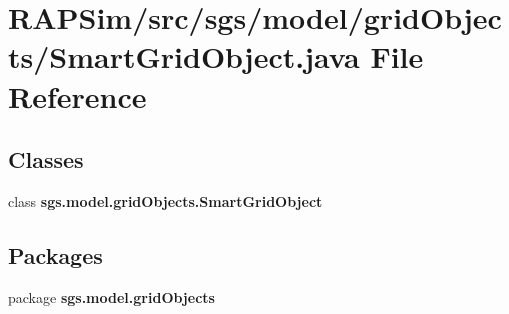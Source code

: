 \section{R\-A\-P\-Sim/src/sgs/model/grid\-Objects/\-Smart\-Grid\-Object.java File Reference}
\label{_smart_grid_object_8java}
\subsection*{Classes}
\begin{DoxyCompactItemize}
\item 
class {\bf sgs.\-model.\-grid\-Objects.\-Smart\-Grid\-Object}
\end{DoxyCompactItemize}
\subsection*{Packages}
\begin{DoxyCompactItemize}
\item 
package {\bf sgs.\-model.\-grid\-Objects}
\end{DoxyCompactItemize}
